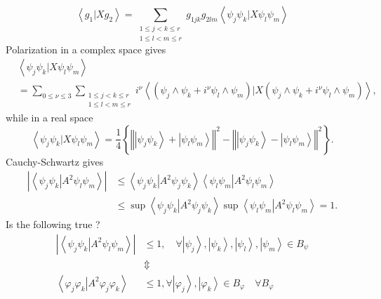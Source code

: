 \documentclass[aps,preprint]{revtex4}%
\begin{document}
\begin{equation}
\left\langle g_{1}\left\vert X\right.  g_{2}\right\rangle =\sum
_{\substack{1\leq j<k\leq r\\1\leq l<m\leq r}}g_{1jk}g_{2lm}\left\langle
\psi_{j}\psi_{k}\left\vert X\right.  \psi_{l}\psi_{m}\right\rangle
\end{equation}
Polarization in a complex space gives
\begin{align}
&  \left\langle \psi_{j}\psi_{k}\left\vert X\right.  \psi_{l}\psi
_{m}\right\rangle \nonumber\\
&  =\sum_{0\leq\nu\leq3}\sum_{\substack{1\leq j<k\leq r\\1\leq l<m\leq
r}}i^{\nu}\left\langle \left(  \psi_{j}\wedge\psi_{k}+i^{\nu}\psi_{l}%
\wedge\psi_{m}\right)  \left\vert X\right.  \left(  \psi_{j}\wedge\psi
_{k}+i^{\nu}\psi_{l}\wedge\psi_{m}\right)  \right\rangle ,
\end{align}
while in a real space
\begin{equation}
\left\langle \psi_{j}\psi_{k}\left\vert X\right.  \psi_{l}\psi_{m}%
\right\rangle =\frac{1}{4}\left\{  \left\Vert \left\vert \psi_{j}\psi
_{k}\right\rangle +\left\vert \psi_{l}\psi_{m}\right\rangle \right\Vert
^{2}-\left\Vert \left\vert \psi_{j}\psi_{k}\right\rangle -\left\vert \psi
_{l}\psi_{m}\right\rangle \right\Vert ^{2}\right\}  .
\end{equation}
Cauchy-Schwartz gives
\begin{align}
\left\vert \left\langle \psi_{j}\psi_{k}\left\vert A^{2}\right.  \psi_{l}%
\psi_{m}\right\rangle \right\vert  &  \leq\left\langle \psi_{j}\psi
_{k}\left\vert A^{2}\right.  \psi_{j}\psi_{k}\right\rangle \left\langle
\psi_{l}\psi_{m}\left\vert A^{2}\right.  \psi_{l}\psi_{m}\right\rangle
\nonumber\\
&  \leq\sup\left\langle \psi_{j}\psi_{k}\left\vert A^{2}\right.  \psi_{j}%
\psi_{k}\right\rangle \sup\left\langle \psi_{l}\psi_{m}\left\vert
A^{2}\right.  \psi_{l}\psi_{m}\right\rangle =1.
\end{align}
Is the following true ?
\begin{align}
\left\vert \left\langle \psi_{j}\psi_{k}\left\vert A^{2}\right.  \psi_{l}%
\psi_{m}\right\rangle \right\vert  &  \leq1,\quad\forall\left\vert \psi
_{j}\right\rangle ,\left\vert \psi_{k}\right\rangle ,\left\vert \psi
_{l}\right\rangle ,\left\vert \psi_{m}\right\rangle \in B_{\psi}\nonumber\\
&  \Updownarrow\nonumber\\
\left\langle \varphi_{j}\varphi_{k}\left\vert A^{2}\right.  \varphi_{j}%
\varphi_{k}\right\rangle  &  \leq1,\forall\left\vert \varphi_{j}\right\rangle
,\left\vert \varphi_{k}\right\rangle \in B_{\varphi}\quad\forall B_{\varphi}%
\end{align}
%
\end{document}
